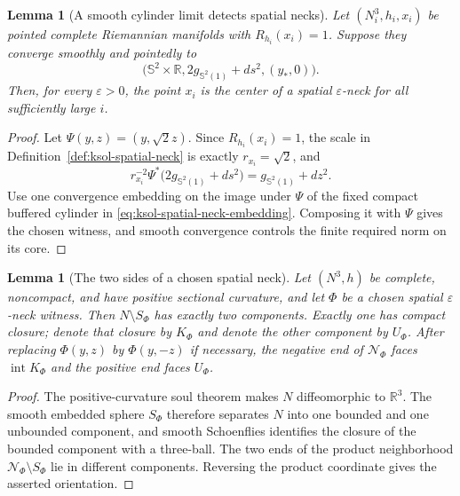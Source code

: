 \documentclass[10pt]{coll-l}
\newcommand{\R}{\mathbb{R}}
\newcommand{\Sph}{\mathbb{S}}
\newtheorem{lemma}[theorem]{Lemma}
\theoremstyle{definition}
\theoremstyle{remark}
\numberwithin{section}{chapter}
\numberwithin{equation}{chapter}
\begin{document}
\begin{lemma}[A smooth cylinder limit detects spatial necks]
\label{lem:ksol-spatial-neck-detection}
Let $(N_i^3,h_i,x_i)$ be pointed complete Riemannian manifolds with
$R_{h_i}(x_i)=1$.  Suppose they converge smoothly and pointedly to
\begin{equation}
 \bigl(\Sph^2\times\R,
       2g_{\Sph^2(1)}+ds^2,(y_*,0)\bigr).             \label{eq:ksol-spatial-cylinder-limit}
\end{equation}
Then, for every $\varepsilon>0$, the point $x_i$ is the center of a spatial
$\varepsilon$-neck for all sufficiently large $i$.
\end{lemma}

\begin{proof}
Let $\Psi(y,z)=(y,\sqrt2z)$.  Since $R_{h_i}(x_i)=1$, the scale in
Definition~\ref{def:ksol-spatial-neck} is exactly $r_{x_i}=\sqrt2$, and
\[
 r_{x_i}^{-2}\Psi^*
       \bigl(2g_{\Sph^2(1)}+ds^2\bigr)
       =g_{\Sph^2(1)}+dz^2.
\]
Use one convergence embedding on the image under $\Psi$ of the fixed
compact buffered cylinder in
\eqref{eq:ksol-spatial-neck-embedding}.  Composing it with $\Psi$ gives
the chosen witness, and smooth convergence controls the finite required
norm on its core.
\end{proof}

\begin{lemma}[The two sides of a chosen spatial neck]
\label{lem:ksol-spatial-neck-two-sides}
Let $(N^3,h)$ be complete, noncompact, and have positive sectional
curvature, and let $\Phi$ be a chosen spatial $\varepsilon$-neck witness.
Then $N\setminus S_\Phi$ has exactly two components.  Exactly one has
compact closure; denote that closure by $K_\Phi$ and denote the other
component by $U_\Phi$.  After replacing $\Phi(y,z)$ by $\Phi(y,-z)$ if
necessary, the negative end of $\mathcal N_\Phi$ faces
$\operatorname{int}K_\Phi$ and the positive end faces $U_\Phi$.
\end{lemma}

\begin{proof}
The positive-curvature soul theorem makes $N$ diffeomorphic to $\R^3$.
The smooth embedded sphere $S_\Phi$ therefore separates $N$ into one
bounded and one unbounded component, and smooth Schoenflies identifies the
closure of the bounded component with a three-ball.  The two ends of the
product neighborhood $\mathcal N_\Phi\setminus S_\Phi$ lie in different
components.  Reversing the product coordinate gives the asserted
orientation.
\end{proof}
\end{document}
